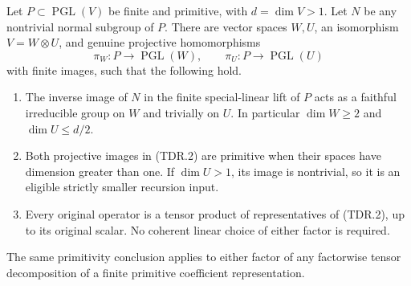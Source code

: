 \begin{lemma}[D-TD11]
Let $P\subset\operatorname{PGL}(V)$ be finite and primitive, with
$d=\dim V>1$.  Let $N$ be any nontrivial normal subgroup of $P$.
There are vector spaces $W,U$, an isomorphism $V=W\otimes U$, and
genuine projective homomorphisms
\[
 \pi_W:P\longrightarrow\operatorname{PGL}(W),\qquad
 \pi_U:P\longrightarrow\operatorname{PGL}(U)
 \tag{TDR.2}
\]
with finite images, such that the following hold.
\begin{enumerate}
\item The inverse image of $N$ in the finite special-linear lift of
$P$ acts as a faithful irreducible group on $W$ and trivially on $U$.
In particular $\dim W\ge2$ and $\dim U\le d/2$.
\item Both projective images in (TDR.2) are primitive when their
spaces have dimension greater than one.  If $\dim U>1$, its image
is nontrivial, so it is an eligible strictly smaller recursion input.
\item Every original operator is a tensor product of representatives
of (TDR.2), up to its original scalar.  No coherent linear choice
of either factor is required.
\end{enumerate}
The same primitivity conclusion applies to either factor of any
factorwise tensor decomposition of a finite primitive coefficient
representation.
\end{lemma}

